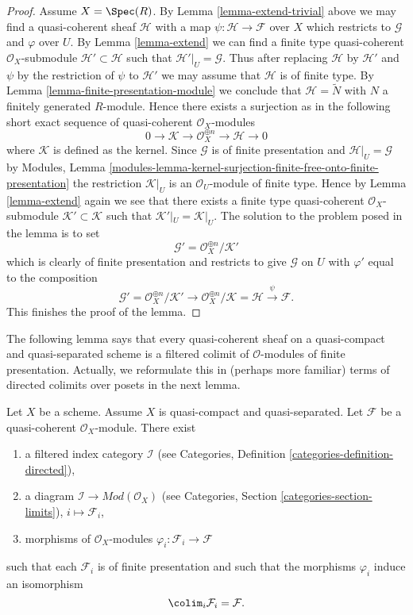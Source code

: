 \begin{proof}
\medskip\noindent
Assume $X = \Spec(R)$.
By Lemma \ref{lemma-extend-trivial} above we may
find a quasi-coherent sheaf $\mathcal{H}$ with
a map $\psi : \mathcal{H} \to \mathcal{F}$ over $X$
which restricts to $\mathcal{G}$ and $\varphi$ over $U$.
By Lemma \ref{lemma-extend} we can find a finite type
quasi-coherent $\mathcal{O}_X$-submodule
$\mathcal{H}' \subset \mathcal{H}$
such that $\mathcal{H}'|_U = \mathcal{G}$. Thus after
replacing $\mathcal{H}$ by $\mathcal{H}'$
and $\psi$ by the restriction of $\psi$ to $\mathcal{H}'$
we may assume that $\mathcal{H}$ is of finite type.
By Lemma \ref{lemma-finite-presentation-module}
we conclude that $\mathcal{H} = \widetilde{N}$ with
$N$ a finitely generated $R$-module. Hence there exists a surjection
as in the following short exact sequence of
quasi-coherent $\mathcal{O}_X$-modules
$$
0 \to \mathcal{K} \to \mathcal{O}_X^{\oplus n} \to \mathcal{H} \to 0
$$
where $\mathcal{K}$ is defined as the kernel.
Since $\mathcal{G}$ is of finite presentation and
$\mathcal{H}|_U = \mathcal{G}$ by
Modules, Lemma
\ref{modules-lemma-kernel-surjection-finite-free-onto-finite-presentation}
the restriction $\mathcal{K}|_U$ is
an $\mathcal{O}_U$-module of finite type. Hence by Lemma \ref{lemma-extend}
again we see that there exists a finite type quasi-coherent
$\mathcal{O}_X$-submodule $\mathcal{K}' \subset \mathcal{K}$ such
that $\mathcal{K}'|_U = \mathcal{K}|_U$. The solution to the problem
posed in the lemma is to set
$$
\mathcal{G}' = \mathcal{O}_X^{\oplus n}/\mathcal{K}'
$$
which is clearly of finite presentation and restricts to give $\mathcal{G}$
on $U$ with $\varphi'$ equal to the composition
$$
\mathcal{G}' = \mathcal{O}_X^{\oplus n}/\mathcal{K}'
\to \mathcal{O}_X^{\oplus n}/\mathcal{K} = \mathcal{H} \xrightarrow{\psi}
\mathcal{F}.
$$
This finishes the proof of the lemma.
\end{proof}

\noindent
The following lemma says that every quasi-coherent sheaf on a quasi-compact
and quasi-separated scheme is a filtered colimit of $\mathcal{O}$-modules
of finite presentation. Actually, we reformulate this in (perhaps more
familiar) terms of directed colimits over posets in the next lemma.

\begin{lemma}
\label{lemma-directed-colimit-diagram-finite-presentation}
Let $X$ be a scheme. Assume $X$ is quasi-compact and quasi-separated.
Let $\mathcal{F}$ be a quasi-coherent $\mathcal{O}_X$-module.
There exist
\begin{enumerate}
\item a filtered index category $\mathcal{I}$ (see
Categories, Definition \ref{categories-definition-directed}),
\item a diagram $\mathcal{I} \to \textit{Mod}(\mathcal{O}_X)$ (see
Categories, Section \ref{categories-section-limits}),
$i \mapsto \mathcal{F}_i$,
\item morphisms of $\mathcal{O}_X$-modules
$\varphi_i : \mathcal{F}_i \to \mathcal{F}$
\end{enumerate}
such that each $\mathcal{F}_i$ is of finite presentation
and such that the morphisms $\varphi_i$ induce an isomorphism
$$
\colim_i \mathcal{F}_i
=
\mathcal{F}.
$$
\end{lemma}

